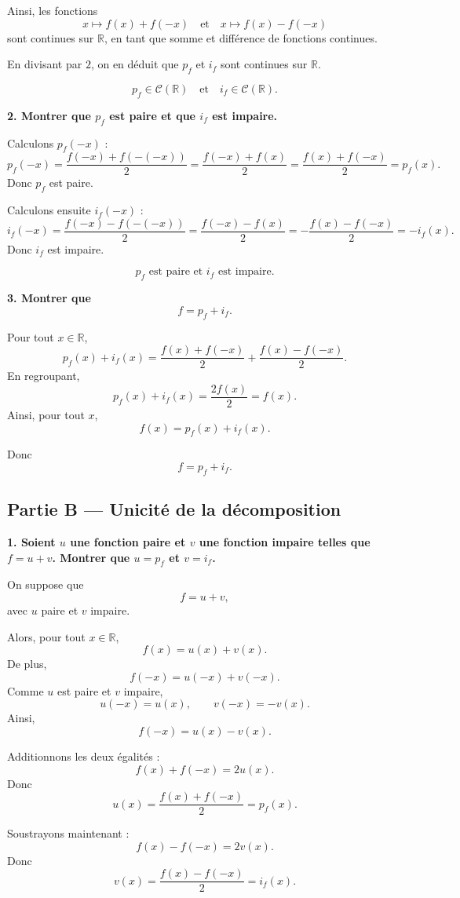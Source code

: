 \documentclass[11pt,a4paper]{article}
\newcommand{\R}{\mathbb{R}}
\begin{document}
Ainsi, les fonctions
\[
x\mapsto f(x)+f(-x)
\quad \text{et} \quad
x\mapsto f(x)-f(-x)
\]
sont continues sur \(\R\), en tant que somme et différence de fonctions continues.

En divisant par \(2\), on en déduit que \(p_f\) et \(i_f\) sont continues sur \(\R\).

\[
\boxed{p_f\in \mathcal C(\R)\quad \text{et}\quad i_f\in \mathcal C(\R).}
\]

\bigskip

\textbf{2. Montrer que \(p_f\) est paire et que \(i_f\) est impaire.}

Calculons \(p_f(-x)\) :
\[
p_f(-x)=\frac{f(-x)+f(-(-x))}{2}
=\frac{f(-x)+f(x)}{2}
=\frac{f(x)+f(-x)}{2}
=p_f(x).
\]
Donc \(p_f\) est paire.

Calculons ensuite \(i_f(-x)\) :
\[
i_f(-x)=\frac{f(-x)-f(-(-x))}{2}
=\frac{f(-x)-f(x)}{2}
=-\frac{f(x)-f(-x)}{2}
=-i_f(x).
\]
Donc \(i_f\) est impaire.

\[
\boxed{p_f \text{ est paire et } i_f \text{ est impaire.}}
\]

\bigskip

\textbf{3. Montrer que}
\[
f=p_f+i_f.
\]

Pour tout \(x\in\R\),
\[
p_f(x)+i_f(x)
=\frac{f(x)+f(-x)}{2}+\frac{f(x)-f(-x)}{2}.
\]
En regroupant,
\[
p_f(x)+i_f(x)=\frac{2f(x)}{2}=f(x).
\]
Ainsi, pour tout \(x\),
\[
f(x)=p_f(x)+i_f(x).
\]

Donc
\[
\boxed{f=p_f+i_f.}
\]

\bigskip

\subsection*{Partie B --- Unicité de la décomposition}

\textbf{1. Soient \(u\) une fonction paire et \(v\) une fonction impaire telles que \(f=u+v\). Montrer que \(u=p_f\) et \(v=i_f\).}

On suppose que
\[
f=u+v,
\]
avec \(u\) paire et \(v\) impaire.

Alors, pour tout \(x\in\R\),
\[
f(x)=u(x)+v(x).
\]
De plus,
\[
f(-x)=u(-x)+v(-x).
\]
Comme \(u\) est paire et \(v\) impaire,
\[
u(-x)=u(x),\qquad v(-x)=-v(x).
\]
Ainsi,
\[
f(-x)=u(x)-v(x).
\]

Additionnons les deux égalités :
\[
f(x)+f(-x)=2u(x).
\]
Donc
\[
u(x)=\frac{f(x)+f(-x)}{2}=p_f(x).
\]

Soustrayons maintenant :
\[
f(x)-f(-x)=2v(x).
\]
Donc
\[
v(x)=\frac{f(x)-f(-x)}{2}=i_f(x).
\]
\end{document}

